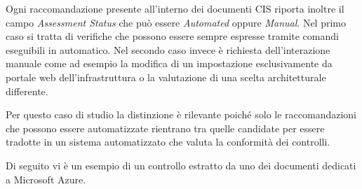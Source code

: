 \documentclass[a4paper,11pt]{report}
\begin{document}
Ogni raccomandazione presente all'interno dei documenti CIS riporta inoltre il campo \emph{Assessment Status} che può essere \emph{Automated} oppure \emph{Manual}.
Nel primo caso si tratta di verifiche che possono essere sempre espresse tramite comandi eseguibili in automatico.
Nel secondo caso invece è richiesta dell'interazione manuale come ad esempio la modifica di un impostazione esclusivamente da portale web dell'infrastruttura o la valutazione di una scelta architetturale differente.

Per questo caso di studio la distinzione è rilevante poiché solo le raccomandazioni che possono essere automatizzate rientrano tra quelle candidate per essere tradotte in un sistema automatizzato che valuta la conformità dei controlli.

Di seguito vi è un esempio di un controllo estratto da uno dei documenti dedicati a Microsoft Azure. \\ \\
\end{document}
